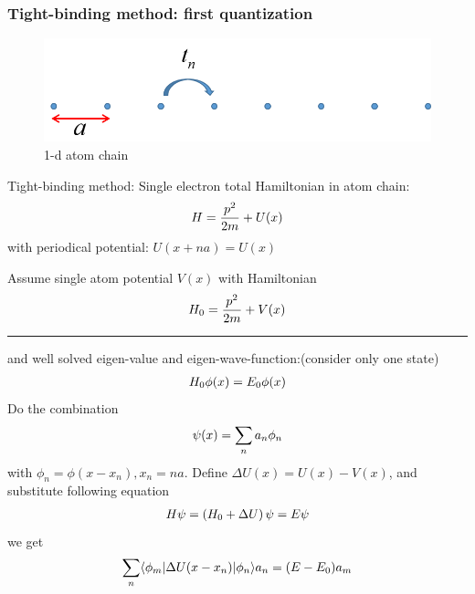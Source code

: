\documentclass[letterpaper,10pt,english]{sphinxmanual}
\begin{document}
\subsubsection{Tight-binding method: first quantization}
\label{TI/Lecture notes/1:tight-binding-method-first-quantization}\begin{figure}[htbp]
\centering
\capstart

\includegraphics[width=0.700\linewidth]{3.png}
\caption{1-d atom chain}\end{figure}

Tight-binding method: Single electron total Hamiltonian in atom chain:
\begin{gather}
\begin{split}H=\frac{p^2}{2m}+U(x)\end{split}\notag
\end{gather}
with periodical potential: \(U(x+na)=U(x)\)

Assume single atom potential \(V(x)\) with Hamiltonian
\begin{gather}
\begin{split}H_0=\frac{p^2}{2m}+V(x)\end{split}\notag
\end{gather}

\bigskip\hrule{}\bigskip


and well solved eigen-value and eigen-wave-function:(consider only one
state)
\begin{gather}
\begin{split}H_0\phi(x)=E_0\phi(x)\end{split}\notag
\end{gather}
Do the combination
\begin{gather}
\begin{split}\psi(x)=\sum\limits_n a_n\phi_n\end{split}\notag
\end{gather}
with \(\phi_n=\phi(x-x_n), x_n=na\). Define
\(\Delta U(x)=U(x)-V(x)\), and substitute following equation
\begin{gather}
\begin{split}H\psi=\left(H_0+\Delta U\right)\psi=E\psi\end{split}\notag
\end{gather}
we get
\begin{gather}
\begin{split}\sum_n \langle \phi_m|\Delta U(x-x_n)|\phi_n\rangle a_n=(E-E_0)a_m\end{split}\notag
\end{gather}
\end{document}
